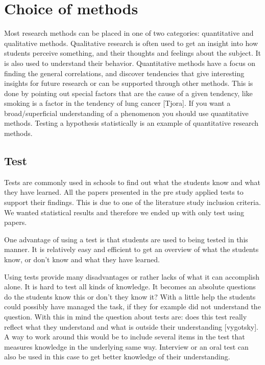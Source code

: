\chapter{Choice of methods}
Most research methods can be placed in one of two categories: quantitative and qualitative methods. Qualitative research is often used to get an insight into how students perceive something, and their thoughts and feelings about the subject. It is also used to understand their behavior. Quantitative methods have a focus on finding the general correlations, and discover tendencies that give interesting insights for future research or can be supported through other methods. This is done by pointing out special factors that are the cause of a given tendency, like smoking is a factor in the tendency of lung cancer [Tjora]. If you want a broad/superficial understanding of a phenomenon you should use quantitative methods. Testing a hypothesis statistically is an example of quantitative research methods. 

\section{Test}
Tests are commonly used  in schools to find out what the students know and what they have learned. All the papers presented in the pre study applied tests to support their findings. This is due to one of the literature study inclusion criteria. We wanted statistical results and therefore we ended up with only test using papers. 

\bigskip\noindent
One advantage of using a test is that students are used to being tested in this manner. It is relatively easy and efficient to get an overview of what the students know, or don't know and what they have learned.

\bigskip\noindent
Using tests provide many disadvantages or rather lacks of what it can accomplish alone. It is hard to test all kinds of knowledge. It becomes an absolute questions do the students know this or don't they know it? With a little help the students could possibly have managed the task, if they for example did not understand the question. With this in mind the question about tests are: does this test really reflect what they understand and what is outside their understanding [vygotsky]. A way to work around this would be to include several items in the test that measures knowledge in the underlying same way. Interview or an oral test can also be used in this case to get better knowledge of their understanding.

